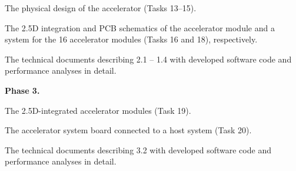  The physical design of the accelerator (Tasks 13--15).

 The 2.5D integration and PCB schematics of the accelerator module and a system for the 16 accelerator modules (Tasks 16 and 18), respectively.

 The technical documents describing 2.1 -- 1.4 with developed software code and performance analyses in detail.


\noindent
\textbf{Phase 3.}

 The 2.5D-integrated accelerator modules (Task 19).

 The accelerator system board connected to a host system (Task 20).

 The technical documents describing 3.2 with developed software code and performance analyses in detail.
